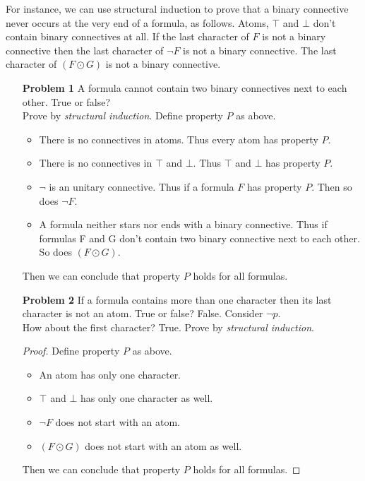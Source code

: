 For instance, we can use structural induction to prove that a binary connective never occurs at the very end of a formula, as follows. Atoms, $\top$ and $\bot$ don't contain binary connectives at all. If the last character of $F$ is not a binary connective then the last character of $\neg F$ is not a binary connective. The last character of $\left( F \odot G \right)$ is not a binary connective. 

\begin{enumerate}
\item[\textbf{Problem 1}] A formula cannot contain two binary connectives next to each other. True or false?\\
Prove by \textit{structural induction}. Define property $P$ as above. 
\begin{itemize}
\item There is no connectives in atoms. Thus every atom has property $P$. 
\item There is no connectives in $\top$ and $\bot$. Thus $\top$ and $\bot$ has property $P$. 
\item $\neg$ is an unitary connective. Thus if a formula $F$ has property $P$. Then so does $\neg F$. 
\item A formula neither stars nor ends with a binary connective. Thus if formulas F and G don't contain two binary connective next to each other. So does $(F \odot G)$. 
\end{itemize}
\noindent Then we can conclude that property $P$ holds for all formulas. 

\item[\textbf{Problem 2}] If a formula contains more than one character then its last character is not an atom. True or false?  False. Consider $\neg p$.  \\
How about the first character? \qquad True. Prove by \textit{structural induction}. 
\begin{proof}
Define property $P$ as above. 
\begin{itemize}
\item An atom has only one character. 
\item $\top$ and $\bot$ has only one character as well. 
\item $\neg F$ does not start with an atom. 
\item $(F \odot G)$ does not start with an atom as well.   
\end{itemize}
\noindent Then we can conclude that property $P$ holds for all formulas. 
\end{proof}
\end{enumerate}

